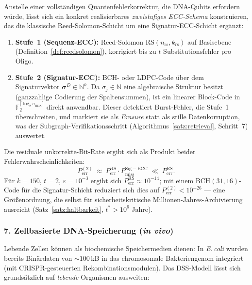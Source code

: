 ﻿\documentclass[a4paper,12pt]{article}
\theoremstyle{definition}
\begin{document}
Anstelle einer vollst\"{a}ndigen Quantenfehlerkorrektur, die DNA-Qubits
erfordern w\"{u}rde, l\"{a}sst sich ein konkret realisierbares
\emph{zweistufiges ECC-Schema} konstruieren, das die klassische
Reed-Solomon-Schicht um eine Signatur-ECC-Schicht erg\"{a}nzt:

\begin{enumerate}
    \item \textbf{Stufe~1 (Sequenz-ECC):} Reed-Solomon $\mathrm{RS}(n_{\mathrm{rs}},k_{\mathrm{rs}})$
          auf Basisebene (Definition~\ref{def:reedsolomon}), korrigiert
          bis zu $t$ Substitutionsfehler pro Oligo.
    \item \textbf{Stufe~2 (Signatur-ECC):} BCH- oder LDPC-Code
          \"{u}ber dem Signaturvektor $\boldsymbol{\sigma}^D \in \mathbb{N}^k$.
          Da $\sigma_j \in \mathbb{N}$ eine algebraische Struktur besitzt
          (ganzzahlige Codierung der Spaltensummen), ist ein linearer
          Block-Code in $\mathbb{F}_2^{\lceil\log_2\sigma_{\max}\rceil}$
          direkt anwendbar.
          Dieser detektiert Burst-Fehler, die Stufe~1 \"{u}berschreiten,
          und markiert sie als \emph{Erasure} statt als stille Datenkorruption,
          was der Subgraph-Verifikationsschritt (Algorithmus~\ref{satz:retrieval},
          Schritt~7) auswertet.
\end{enumerate}

Die residuale unkorrekte-Bit-Rate ergibt sich als Produkt beider
Fehlerwahrscheinlichkeiten:
\[
    P_{\mathrm{err}}^{(2)} \;\approx\;
    P_{\mathrm{err}}^{\mathrm{RS}} \cdot P_{\mathrm{miss}}^{\mathrm{Sig-ECC}}
    \;\ll\; P_{\mathrm{err}}^{\mathrm{RS}}.
\]
F\"{u}r $k=150$, $t=2$, $\varepsilon = 10^{-3}$ ergibt sich
$P_{\mathrm{err}}^{\mathrm{RS}} \approx 10^{-14}$;
mit einem BCH$(31,16)$-Code f\"{u}r die Signatur-Schicht reduziert sich
dies auf $P_{\mathrm{err}}^{(2)} < 10^{-26}$ ---
eine Gr\"{o}\ss{}enordnung, die selbst f\"{u}r sicherheitskritische
Millionen-Jahres-Archivierung ausreicht
(Satz~\ref{satz:haltbarkeit}, $t^* > 10^6$ Jahre).

\subsubsection*{7.\; Zellbasierte DNA-Speicherung (\textit{in vivo})}

Lebende Zellen k\"{o}nnen als biochemische Speichermedien dienen:
In \emph{E.\,coli} wurden bereits Bin\"{a}rdaten von $\sim\!100$\,kB
in das chromosomale Bakteriengenom integriert
(mit CRISPR-gesteuerten Rekombinationsmodulen).
Das DSS-Modell l\"{a}sst sich grunds\"{a}tzlich auf \emph{lebende} Organismen
ausweiten:
\end{document}
